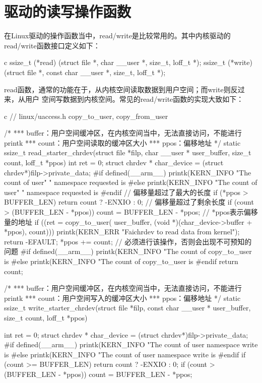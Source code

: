 \section{驱动的读写操作函数}
在Linux驱动的操作函数当中，read/write是比较常用的。其中内核驱动的read/write函数接口定义如下：
\begin{code-block}{c}
ssize_t (*read) (struct file *, char __user *, size_t, loff_t *);
ssize_t (*write) (struct file *, const char __user *, size_t, loff_t *);
\end{code-block}
read函数，通常的功能在于，从内核空间读取数据到用户空间；而write则反过来，从用户
空间写数据到内核空间。常见的read/write函数的实现大致如下：
\begin{code-block}{c}
// linux/uaccess.h copy_to_user, copy_from_user

/*
*** buffer：用户空间缓冲区，在内核空间当中，无法直接访问，不能进行printk
*** count：用户空间读取的缓冲区大小
*** ppos：偏移地址
*/
static ssize_t read_starter_chrdev(struct file *filp,
        char __user * user_buffer, size_t count, loff_t *ppos)
{
        int ret = 0;
        struct chrdev * char_device = (struct chrdev*)filp->private_data;
#if defined(__arm__)
        printk(KERN_INFO "The count of user"
                        " namespace requested is %
#else
        printk(KERN_INFO "The count of user"
                        " namespace requested is %
#endif
        // 偏移量超过了最大的长度
        if (*ppos > BUFFER_LEN) {
                return count ? -ENXIO : 0;
        }
        // 偏移量超过了剩余长度
        if (count > (BUFFER_LEN - *ppos)) {
                count = BUFFER_LEN - *ppos;
        }
        // *ppos表示偏移量的地址
        if ((ret = copy_to_user(
                user_buffer, (void *)(char_device->buffer + *ppos), count))) {
                printk(KERN_ERR "Faichrdev to read data from kernel\n");
                return -EFAULT;
        }
        *ppos += count; // 必须进行该操作，否则会出现不可预知的问题
#if defined(__arm__)
        printk(KERN_INFO "The count of copy_to_user is %
#else
        printk(KERN_INFO "The count of copy_to_user is %
#endif
        return count;
}

/*
*** buffer：用户空间缓冲区，在内核空间当中，无法直接访问，不能进行printk
*** count：用户空间写入的缓冲区大小
*** ppos：偏移地址
*/
static ssize_t write_starter_chrdev(struct file *filp,
        const char __user * user_buffer, size_t count, loff_t *ppos)
{
        int ret = 0;
        struct chrdev * char_device = (struct chrdev*)filp->private_data;
#if defined(__arm__)
        printk(KERN_INFO
                "The count of user namespace write is %
#else
        printk(KERN_INFO
                "The count of user namespace write is %
#endif
        if (count >= BUFFER_LEN) {
                return count ? -ENXIO : 0;
        }
        if (count > (BUFFER_LEN - *ppos)) {
                count = BUFFER_LEN - *ppos;
        }

}
\end{code-block}
